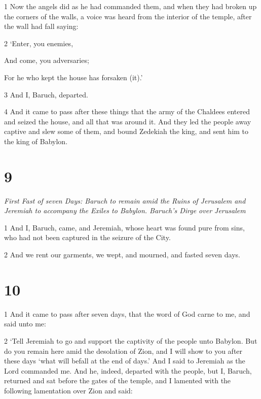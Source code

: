 \par 1 Now the angels did as he had commanded them, and when they had broken up the corners of the walls, a voice was heard from the interior of the temple, after the wall had fall saying:

\par 2 ‘Enter, you enemies,

\par And come, you adversaries;

\par For he who kept the house has forsaken (it).’

\par 3 And I, Baruch, departed. 

\par 4 And it came to pass after these things that the army of the Chaldees entered and seized the house, and all that was around it. And they led the people away captive and slew some of them, and bound Zedekiah the king, and sent him to the king of Babylon.

\chapter{9}

\par \textit{First Fast of seven Days: Baruch to remain amid the Ruins of Jerusalem and Jeremiah to accompany the Exiles to Babylon. Baruch's Dirge over Jerusalem}

\par 1 And I, Baruch, came, and Jeremiah, whose heart was found pure from sins, who had not been captured in the seizure of the City. 

\par 2 And we rent our garments, we wept, and mourned, and fasted seven days.

\chapter{10}

\par 1 And it came to pass after seven days, that the word of God carne to me, and said unto me: 

\par 2 ‘Tell Jeremiah to go and support the captivity of the people unto Babylon. But do you remain here amid the desolation of Zion, and I will show to you after these days ‘what will befall at the end of days.’ And I said to Jeremiah as the Lord commanded me. And he, indeed, departed with the people, but I, Baruch, returned and sat before the gates of the temple, and I lamented with the following lamentation over Zion and said:

